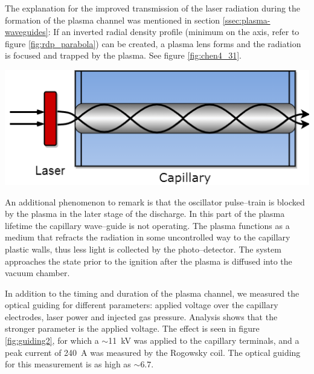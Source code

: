\documentclass[../main.tex]{subfiles}
\begin{document}
The explanation for the improved transmission of the laser radiation during the formation of the plasma channel was mentioned in section \ref{ssec:plasma-waveguides}: If an inverted radial density profile (minimum on the axis, refer to figure \ref{fig:rdp_parabola}) can be created, a plasma lens forms and the radiation is focused and trapped by the plasma. See figure \ref{fig:chen4_31}.
\begin{marginfigure}
\includegraphics[width=\marginparwidth]{figures/chen4_31.png}
\caption{Plasma confined inside the capillary will trap the \SI{800}{\nm} laser light only if the plasma has a density minimum on axis.}
\label{fig:chen4_31}
\end{marginfigure}

An additional phenomenon to remark is that the oscillator pulse--train is blocked by the plasma in the later stage of the discharge. In this part of the plasma lifetime the capillary wave--guide is not operating. The plasma functions as a medium that refracts the radiation in some uncontrolled way to the capillary plastic walls, thus less light is collected by the photo--detector. The system approaches the state prior to the ignition after the plasma is diffused into the vacuum chamber.

In addition to the timing and duration of the plasma channel, we measured the optical guiding for different parameters: applied voltage over the capillary electrodes, laser power and injected gas pressure. Analysis shows that the stronger parameter is the applied voltage. The effect is seen in figure \ref{fig:guiding2}, for which a $\sim$\SI{11}{\kilo\volt} was applied to the capillary terminals, and a peak current of \SI{240}{\A} was measured by the Rogowsky coil. The optical guiding for this measurement is as high as $\sim 6.7$.
\end{document}
